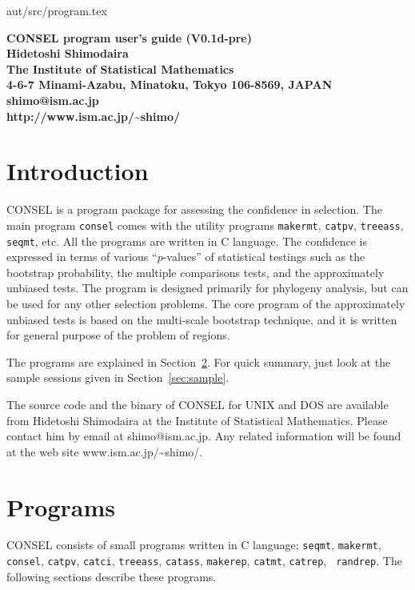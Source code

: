 \documentclass[12pt]{article}
\newcommand{\refsec}[1]{Section~\ref{sec:#1}}
\begin{document}
{aut/src/program.tex\hfill \documentid}
\begin{center}
 \bf\large CONSEL program user's guide (V0.1d-pre)\\[3ex]
 Hidetoshi Shimodaira\\[2ex]
 \normalsize
 The Institute of Statistical Mathematics\\
 4-6-7 Minami-Azabu, Minatoku, Tokyo 106-8569, JAPAN\\
 shimo@ism.ac.jp\\
 http://www.ism.ac.jp/\~{}shimo/
\end{center}

\section{Introduction}

CONSEL is a program package for assessing the confidence in
selection. The main program {\tt consel} comes with the utility programs
{\tt makermt}, {\tt catpv}, {\tt treeass}, {\tt seqmt}, etc. All the
programs are written in C language. The confidence is expressed in terms
of various ``$p$-values'' of statistical testings such as the bootstrap
probability, the multiple comparisons tests, and the approximately
unbiased tests. The program is designed primarily for phylogeny
analysis, but can be used for any other selection problems. The core
program of the approximately unbiased tests is based on the multi-scale
bootstrap technique, and it is written for general purpose of the
problem of regions.

The programs are explained in \refsec{usage}.  For quick summary, just
look at the sample sessions given in \refsec{sample}.

The source code and the binary of CONSEL for UNIX and DOS are available
from Hidetoshi Shimodaira at the Institute of Statistical
Mathematics. Please contact him by email at shimo@ism.ac.jp. Any related
information will be found at the web site www.ism.ac.jp/\~{}shimo/.



\section{Programs} \label{sec:usage}

CONSEL consists of small programs written in C language; {\tt seqmt},
{\tt makermt}, {\tt consel}, {\tt catpv}, {\tt catci}, {\tt treeass},
{\tt catass}, {\tt makerep}, {\tt catmt}, {\tt catrep}, {\tt
randrep}. The following sections describe these programs.
\end{document}
